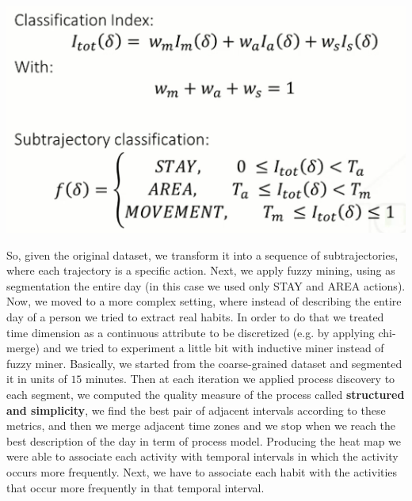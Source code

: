 \documentclass[11pt]{article}
\begin{document}
\begin{center}
\includegraphics[scale=0.5]{./images/BPM_thresholds.png}
\end{center}

So, given the original dataset, we transform it into a sequence of subtrajectories, where each trajectory is a specific action. Next, we apply fuzzy mining, using as segmentation the entire day (in this case we used only STAY and AREA actions). Now, we moved to a more complex setting, where instead of describing the entire day of a person we tried to extract real habits. In order to do that we treated time dimension as a continuous attribute to be discretized (e.g. by applying chi-merge) and we tried to experiment a little bit with inductive miner instead of fuzzy miner. Basically, we started from the coarse-grained dataset and segmented it in units of $15$ minutes. Then at each iteration we applied process discovery to each segment, we computed the quality measure of the process called \textbf{structured and simplicity}, we find the best pair of adjacent intervals according to these metrics, and then we merge adjacent time zones and we stop when we reach the best description of the day in term of process model. Producing the heat map we were able to associate each activity with temporal intervals in which the activity occurs more frequently. Next, we have to associate each habit with the activities that occur more frequently in that temporal interval.
\end{document}
